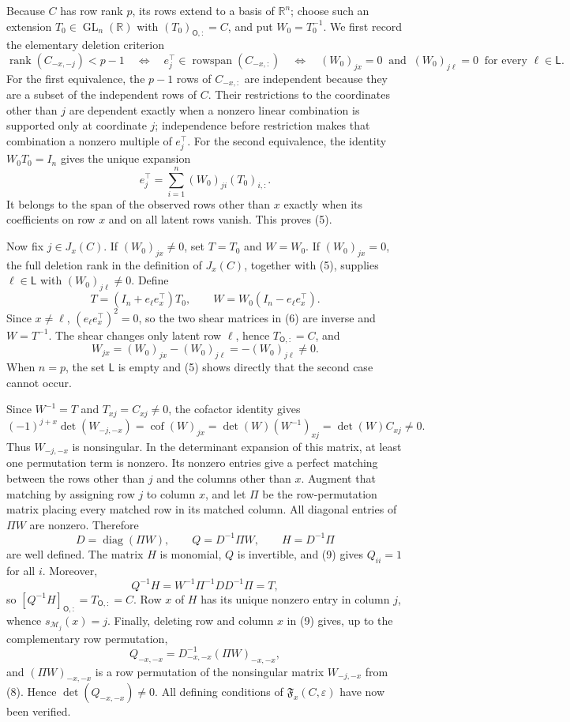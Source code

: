 Because \(C\) has row rank \(p\), its rows extend to a basis of \(\mathbb R^n\); choose such an extension \(T_0\in\operatorname{GL}_n(\mathbb R)\) with \((T_0)_{\mathsf O,:}=C\), and put \(W_0=T_0^{-1}\). We first record the elementary deletion criterion
\[
 \operatorname{rank}(C_{-x,-j})<p-1
 \quad\Longleftrightarrow\quad
 e_j^{\top}\in\operatorname{rowspan}(C_{-x,:})
 \quad\Longleftrightarrow\quad
 (W_0)_{jx}=0\ \text{ and }\ (W_0)_{j\ell}=0\ \text{ for every }\ell\in\mathsf L. \tag{5}
\]
For the first equivalence, the \(p-1\) rows of \(C_{-x,:}\) are independent because they are a subset of the independent rows of \(C\). Their restrictions to the coordinates other than \(j\) are dependent exactly when a nonzero linear combination is supported only at coordinate \(j\); independence before restriction makes that combination a nonzero multiple of \(e_j^{\top}\). For the second equivalence, the identity \(W_0T_0=I_n\) gives the unique expansion
\[
 e_j^{\top}=\sum_{i=1}^n (W_0)_{ji}(T_0)_{i,:}.
\]
It belongs to the span of the observed rows other than \(x\) exactly when its coefficients on row \(x\) and on all latent rows vanish. This proves (5).

Now fix \(j\in J_x(C)\). If \((W_0)_{jx}\ne0\), set \(T=T_0\) and \(W=W_0\). If \((W_0)_{jx}=0\), the full deletion rank in the definition of \(J_x(C)\), together with (5), supplies \(\ell\in\mathsf L\) with \((W_0)_{j\ell}\ne0\). Define
\[
 T=(I_n+e_\ell e_x^{\top})T_0,
 \qquad
 W=W_0(I_n-e_\ell e_x^{\top}). \tag{6}
\]
Since \(x\ne\ell\), \((e_\ell e_x^{\top})^2=0\), so the two shear matrices in (6) are inverse and \(W=T^{-1}\). The shear changes only latent row \(\ell\), hence \(T_{\mathsf O,:}=C\), and
\[
 W_{jx}=(W_0)_{jx}-(W_0)_{j\ell}=-(W_0)_{j\ell}\ne0. \tag{7}
\]
When \(n=p\), the set \(\mathsf L\) is empty and (5) shows directly that the second case cannot occur.

Since \(W^{-1}=T\) and \(T_{xj}=C_{xj}\ne0\), the cofactor identity gives
\[
 (-1)^{j+x}\det(W_{-j,-x})
 =\operatorname{cof}(W)_{jx}
 =\det(W)(W^{-1})_{xj}
 =\det(W)C_{xj}\ne0. \tag{8}
\]
Thus \(W_{-j,-x}\) is nonsingular. In the determinant expansion of this matrix, at least one permutation term is nonzero. Its nonzero entries give a perfect matching between the rows other than \(j\) and the columns other than \(x\). Augment that matching by assigning row \(j\) to column \(x\), and let \(\Pi\) be the row-permutation matrix placing every matched row in its matched column. All diagonal entries of \(\Pi W\) are nonzero. Therefore
\[
 D=\operatorname{diag}(\Pi W),\qquad
 Q=D^{-1}\Pi W,\qquad
 H=D^{-1}\Pi \tag{9}
\]
are well defined. The matrix \(H\) is monomial, \(Q\) is invertible, and (9) gives \(Q_{ii}=1\) for all \(i\). Moreover,
\[
 Q^{-1}H
 =W^{-1}\Pi^{-1}D D^{-1}\Pi
 =T,
\]
so \([Q^{-1}H]_{\mathsf O,:}=T_{\mathsf O,:}=C\). Row \(x\) of \(H\) has its unique nonzero entry in column \(j\), whence \(s_{\mathcal M_j}(x)=j\). Finally, deleting row and column \(x\) in (9) gives, up to the complementary row permutation,
\[
 Q_{-x,-x}=D_{-x,-x}^{-1}(\Pi W)_{-x,-x},
\]
and \((\Pi W)_{-x,-x}\) is a row permutation of the nonsingular matrix \(W_{-j,-x}\) from (8). Hence \(\det(Q_{-x,-x})\ne0\). All defining conditions of \(\mathfrak F_x(C,\varepsilon)\) have now been verified.

